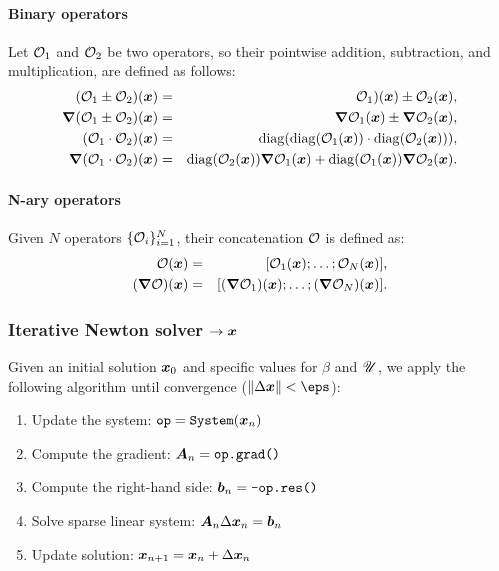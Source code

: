 \paragraph{Binary operators}
Let $\mathcal{O}_1$ and $\mathcal{O}_2$ be two operators, so their pointwise addition, subtraction,
and multiplication, are defined as follows:
\begin{eqnarray}
(\mathcal{O}_1 \pm \mathcal{O}_2)(\boldsymbol{x}) &=& \mathcal{O}_1)(\boldsymbol{x}) \pm \mathcal{O}_2(\boldsymbol{x}), \\
\boldsymbol{\nabla} (\mathcal{O}_1 \pm \mathcal{O}_2)(\boldsymbol{x})   &=& \boldsymbol{\nabla}\mathcal{O}_1(\boldsymbol{x}) \pm \boldsymbol{\nabla}\mathcal{O}_2(\boldsymbol{x}), \\
(\mathcal{O}_1 \cdot \mathcal{O}_2)(\boldsymbol{x}) &=& \mathrm{diag}(\mathrm{diag}(\mathcal{O}_1(\boldsymbol{x})) \cdot \mathrm{diag}(\mathcal{O}_2(\boldsymbol{x}))), \\
\boldsymbol{\nabla} (\mathcal{O}_1 \cdot \mathcal{O}_2)(\boldsymbol{x}) &=& \mathrm{diag}(\mathcal{O}_2(\boldsymbol{x})) \boldsymbol{\nabla}\mathcal{O}_1(\boldsymbol{x}) 
                                  + \mathrm{diag}(\mathcal{O}_1(\boldsymbol{x})) \boldsymbol{\nabla}\mathcal{O}_2(\boldsymbol{x}).
\end{eqnarray}

\paragraph{N-ary operators}
Given $N$ operators $\{\mathcal{O}_i\}_{i=1}^N$, their concatenation $\mathcal{O}$ is defined as:
\begin{eqnarray}
\mathcal{O}(\boldsymbol{x}) &=& [\mathcal{O}_1(\boldsymbol{x}); \ldots; \mathcal{O}_N(\boldsymbol{x})], \\
(\boldsymbol{\nabla}\mathcal{O})(\boldsymbol{x}) &=& [(\boldsymbol{\nabla}\mathcal{O}_1)(\boldsymbol{x}); \ldots; (\boldsymbol{\nabla}\mathcal{O}_N)(\boldsymbol{x})].
\end{eqnarray}

\subsubsection{Iterative Newton solver $\rightarrow \boldsymbol{x}$}
Given an initial solution $\boldsymbol{x}_0$ and specific values for $\beta$ and $\mathscr{U}$, 
we apply the following algorithm 
until convergence ($\|\Delta \bx\| < \eps$):
\begin{enumerate}
\item Update the system: $\verb|op| = \verb|System|(\bx_{n})$
\item Compute the gradient: $\boldsymbol{A}_n = \verb|op.grad()|$
\item Compute the right-hand side: $\boldsymbol{b}_n = \verb|-op.res()|$
\item Solve sparse linear system: $\boldsymbol{A}_n \Delta \boldsymbol{x}_n = \boldsymbol{b}_n$
\item Update solution: $\boldsymbol{x}_{n+1} = \boldsymbol{x}_{n} + \Delta \boldsymbol{x}_{n}$
\end{enumerate}

